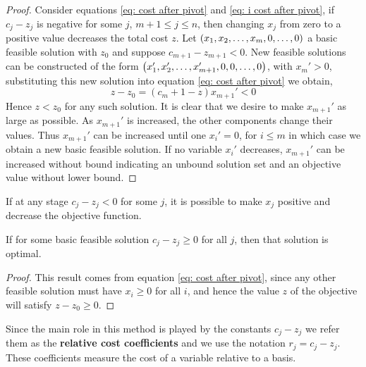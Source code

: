 \begin{proof}
Consider equations \eqref{eq: cost after pivot} and \eqref{eq: i cost after pivot}, if $c_j-z_j$ is negative for some $j$, $m+1\leq j\leq n$, then changing $x_j$ from zero to a positive value decreases the total cost $z$.  Let $\left( x_1, x_2, \dots, x_m, 0,\dots, 0 \right)$ a basic feasible solution with $z_0$ and suppose $c_{m+1}-z_{m+1}<0$. New feasible solutions can be constructed of the form $\left( x_1', x_2',\dots, x_{m+1}',0,0,\dots,0 \right)$, with $x_m'>0$, substituting this new solution into equation \eqref{eq: cost after pivot} we obtain,
\begin{equation*}
	z-z_0=(c_m+1-z)x_{m+1}'<0
\end{equation*}
Hence $z<z_0$ for any such solution. It is clear that we desire to make $x_{m+1}'$ as large as possible.  As $x_{m+1}'$ is increased, the other components change their values. Thus $x_{m+1}'$ can be increased until one $x_i'=0$, for $i\leq m$ in which case we obtain a new basic feasible solution. If no variable $x_i'$ decreases, $x_{m+1}'$ can be increased without bound indicating an unbound solution set and an objective value without lower bound.
\end{proof} 
If at any stage $c_j-z_j<0$ for some $j$, it is possible to make $x_j$ positive and decrease the objective function. 
\begin{theorem}
If for some basic feasible solution $c_j-z_j\geq 0$
for all $j$, then that solution is optimal.
\end{theorem}
\begin{proof}
	This result comes from equation \eqref{eq: cost after pivot}, since any other feasible solution must have $x_i\geq 0$ for all $i$, and hence the value $z$ of the objective will satisfy $z-z_0\geq 0$.
\end{proof}

Since the main role in this method is played by the constants $c_j-z_j$ we refer them as the \textbf{relative cost coefficients} and we use the notation $r_j=c_j-z_j$. These coefficients measure the cost of a variable relative to a basis.


